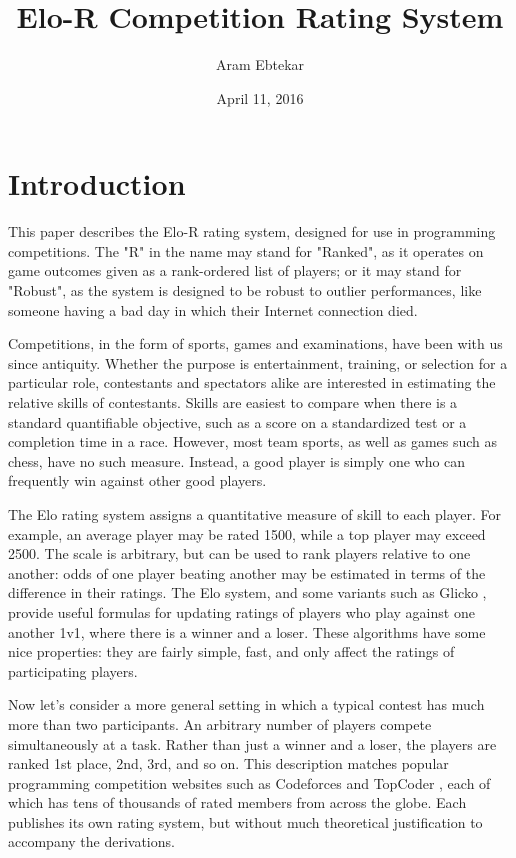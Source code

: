 \documentclass{article}
\title{Elo-R Competition Rating System}
\author{Aram Ebtekar}
\date{April 11, 2016}
\begin{document}
\maketitle

\section{Introduction}

This paper describes the Elo-R rating system, designed for use in programming competitions. The "R" in the name may stand for "Ranked", as it operates on game outcomes given as a rank-ordered list of players; or it may stand for "Robust", as the system is designed to be robust to outlier performances, like someone having a bad day in which their Internet connection died.

Competitions, in the form of sports, games and examinations, have been with us since antiquity. Whether the purpose is entertainment, training, or selection for a particular role, contestants and spectators alike are interested in estimating the relative skills of contestants. Skills are easiest to compare when there is a standard quantifiable objective, such as a score on a standardized test or a completion time in a race.  However, most team sports, as well as games such as chess, have no such measure. Instead, a good player is simply one who can frequently win against other good players.

The Elo rating system assigns a quantitative measure of skill to each player. For example, an average player may be rated 1500, while a top player may exceed 2500. The scale is arbitrary, but can be used to rank players relative to one another: odds of one player beating another may be estimated in terms of the difference in their ratings. The Elo system, and some variants such as Glicko \cite{glicko}, provide useful formulas for updating ratings of players who play against one another 1v1, where there is a winner and a loser. These algorithms have some nice properties: they are fairly simple, fast, and only affect the ratings of participating players.

Now let's consider a more general setting in which a typical contest has much more than two participants. An arbitrary number of players compete simultaneously at a task. Rather than just a winner and a loser, the players are ranked 1st place, 2nd, 3rd, and so on. This description matches popular programming competition websites such as Codeforces \cite{Codeforces} and TopCoder \cite{TopCoder}, each of which has tens of thousands of rated members from across the globe. Each publishes its own rating system, but without much theoretical justification to accompany the derivations.
\end{document}
